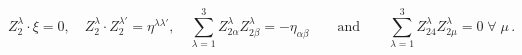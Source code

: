 \begin{equation}\label{eq:pola1}
Z_{2}^{\lambda}\cdot\xi=0,\quad Z_{2}^{\lambda}\cdot
Z_{2}^{\lambda'}=\eta^{\lambda\lambda'},\quad\sum_{\lambda=1}^{3}Z^{\lambda}_{2\alpha}Z^{\lambda}_{2\beta}
=-\eta_{\alpha\beta}\qquad\mbox{and}\qquad
\sum_{\lambda=1}^{3}Z^{\lambda}_{24}Z^{\lambda}_{2\mu}=0\;\forall\;\mu\,.
\end{equation}

